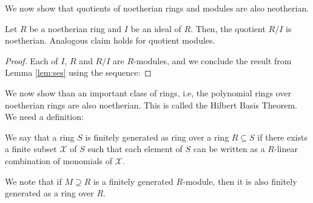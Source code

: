\documentclass[11pt]{article}
\begin{document}
We now show that quotients of noetherian rings and modules are also neotherian.

\begin{lemma}\label{lem:noetherian-quotients}
Let $R$ be a noetherian ring and $I$ be an ideal of $R$.
Then, the quotient $R/I$ is noetherian. Analogous
claim holds for quotient modules.
\end{lemma}
\begin{proof}
Each of $I$, $R$ and $R/I$ are $R$-modules, and we conclude the result from Lemma \ref{lem:ses} using the
sequence:
\end{proof}

We now show than an important class of rings, i.e, the polynomial rings over noetherian rings are also
noetherian. This is called the Hilbert Basis Theorem. We need a definition:
\begin{definition}\label{defn:rings-over-rings}
We say that a ring $S$ is finitely generated as ring over a ring $R\subseteq S$ if there exists a finite subset
$\mathcal{X}$ of $S$ such that each element of $S$ can be written as a $R$-linear combination of
monomials of $\mathcal{X}$.
\end{definition}
We note that if $M\supseteq R$ is a finitely generated $R$-module, then it is also finitely generated as a ring
over $R$.
\end{document}
